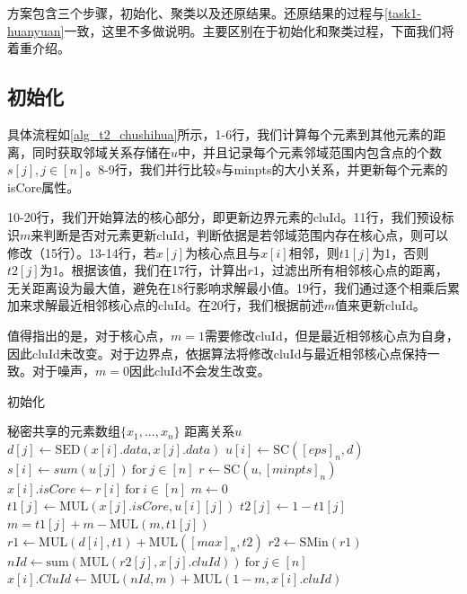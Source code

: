 方案包含三个步骤，初始化、聚类以及还原结果。还原结果的过程与\ref{task1-huanyuan}一致，这里不多做说明。主要区别在于初始化和聚类过程，下面我们将着重介绍。

\subsection{初始化}
具体流程如\ref{alg_t2_chushihua}所示，1-6行，我们计算每个元素到其他元素的距离，同时获取邻域关系存储在$ u $中，并且记录每个元素邻域范围内包含点的个数$ s[j],j\in[n] $。8-9行，我们并行比较$ s $与minpts的大小关系，并更新每个元素的isCore属性。

10-20行，我们开始算法的核心部分，即更新边界元素的cluId。11行，我们预设标识$ m $来判断是否对元素更新cluId，判断依据是若邻域范围内存在核心点，则可以修改（15行）。13-14行，若$ x[j] $为核心点且与$ x[i] $相邻，则$ t1[j] $为1，否则$ t2[j] $为1。根据该值，我们在17行，计算出$ r1 $，过滤出所有相邻核心点的距离，无关距离设为最大值，避免在18行影响求解最小值。19行，我们通过逐个相乘后累加来求解最近相邻核心点的cluId。在20行，我们根据前述$ m $值来更新cluId。

值得指出的是，对于核心点，$ m = 1 $需要修改cluId，但是最近相邻核心点为自身，因此cluId未改变。对于边界点，依据算法将修改cluId与最近相邻核心点保持一致。对于噪声，$ m=0 $因此cluId不会发生改变。
\begin{algorithm}[htbp]
	\renewcommand{\algorithmicrequire}{\textbf{输入:}}
	\renewcommand{\algorithmicensure}{\textbf{输出:}}
	\caption{初始化}
	\label{alg_t2_chushihua}
	\begin{algorithmic}[1]
		\REQUIRE 秘密共享的元素数组$ \{x_1,...,x_n\} $
		\ENSURE 距离关系$ u $
		\STATE $ d[j] \leftarrow \text{SED}(x[i].data, x[j].data) $
		\ENDFOR
		\STATE $ u[i] \leftarrow \text{SC}([eps]_n, d) $
		\STATE $ s[i] \leftarrow sum(u[j])\ \text{for}\ j\in[n]$
		\ENDFOR
		\STATE $ r \leftarrow \text{SC}(u, [minpts]_n) $
		\STATE $ x[i].isCore \leftarrow r[i]\ \text{for}\ i\in[n] $
		\STATE $ m \leftarrow 0 $
		\STATE $ t1[j] \leftarrow \text{MUL}(x[j].isCore, u[i][j]) $
		\STATE $ t2[j] \leftarrow 1-t1[j] $
		\STATE $ m = t1[j] + m - \text{MUL}(m, t1[j]) $ 
		\ENDFOR
		\STATE $ r1 \leftarrow \text{MUL}(d[i], t1) + \text{MUL}([max]_n, t2) $
		\STATE $ r2 \leftarrow \text{SMin}(r1) $
		\STATE $ nId \leftarrow \text{sum}(\text{MUL}(r2[j], x[j].cluId))\ \text{for}\ j \in [n] $
		\STATE $ x[i].CluId \leftarrow \text{MUL}(nId, m) + \text{MUL}(1-m, x[i].cluId)$
		\ENDFOR
	\end{algorithmic}
\end{algorithm}

